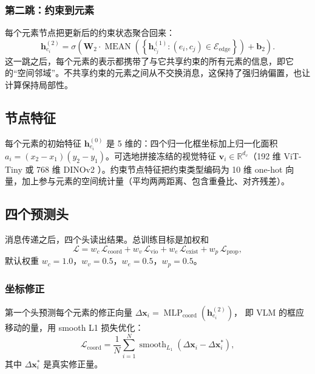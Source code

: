 \documentclass[11pt, letterpaper]{ctexart}
\begin{document}
\subsubsection{第二跳：约束到元素}
每个元素节点把更新后的约束状态聚合回来：
\begin{equation}
\mathbf{h}_{e_i}^{(2)}=\sigma\!\left(\mathbf{W}_2\cdot
\operatorname{MEAN}\!\left(\left\{\mathbf{h}_{c_j}^{(1)}:
(e_i,c_j)\in\mathcal{E}_{\text{edge}}\right\}\right)+\mathbf{b}_2\right).
\label{eq:hop2}
\end{equation}
这一跳之后，每个元素的表示都携带了与它共享约束的所有元素的信息，即它的“空间邻域”。不共享约束的元素之间从不交换消息，这保持了强归纳偏置，也让计算保持局部性。

\subsection{节点特征}
每个元素的初始特征 $\mathbf{h}_{e_i}^{(0)}$ 是 5 维的：四个归一化框坐标加上归一化面积 $a_i=(x_2-x_1)(y_2-y_1)$。可选地拼接冻结的视觉特征 $\mathbf{v}_i\in\mathbb{R}^{d_v}$（192 维 ViT-Tiny 或 768 维 DINOv2 \cite{oquab2024dinov2}）。约束节点特征把约束类型编码为 10 维 one-hot 向量，加上参与元素的空间统计量（平均两两距离、包含重叠比、对齐残差）。

\subsection{四个预测头}
消息传递之后，四个头读出结果。总训练目标是加权和
\begin{equation}
\mathcal{L}=w_c\,\mathcal{L}_{\text{coord}}+w_v\,\mathcal{L}_{\text{vio}}
+w_e\,\mathcal{L}_{\text{exist}}+w_p\,\mathcal{L}_{\text{prop}},
\label{eq:loss}
\end{equation}
默认权重 $w_c{=}1.0$，$w_v{=}0.5$，$w_e{=}0.5$，$w_p{=}0.5$。

\subsubsection{坐标修正}
第一个头预测每个元素的修正向量
$\Delta\mathbf{x}_i=\operatorname{MLP}_{\text{coord}}(\mathbf{h}_{e_i}^{(2)})$，
即 VLM 的框应移动的量，用 smooth L1 损失优化：
\begin{equation}
\mathcal{L}_{\text{coord}}=\frac{1}{N}\sum_{i=1}^{N}
\operatorname{smooth}_{L_1}(\Delta\mathbf{x}_i-\Delta\mathbf{x}_i^*),
\label{eq:lcoord}
\end{equation}
其中 $\Delta\mathbf{x}_i^*$ 是真实修正量。
\end{document}
